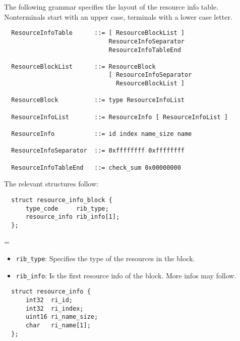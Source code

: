 \documentclass[12pt, a4paper]{article}
\newcommand{\code}[1]{{\tt #1}}
\newenvironment{nitemize}{
  \newdimen\oldparindent
  \oldparindent=\parindent
  \begin{itemize}
  \itemindent=-\oldparindent
}{
  \end{itemize}
}
\newcommand{\codeblockbegin}{\begin{flushleft}\begin{minipage}{\textwidth}}
\newcommand{\codeblockend}{\end{minipage}\end{flushleft}}
\begin{document}
The following grammar specifies the layout of the resource info table.
Nonterminals start with an upper case, terminals with a lower case letter.
%
\begin{verbatim}
  ResourceInfoTable      ::= [ ResourceBlockList ]
                             ResourceInfoSeparator
                             ResourceInfoTableEnd

  ResourceBlockList      ::= ResourceBlock
                             [ ResourceInfoSeparator
                               ResourceBlockList ]

  ResourceBlock          ::= type ResourceInfoList

  ResourceInfoList       ::= ResourceInfo [ ResourceInfoList ]

  ResourceInfo           ::= id index name_size name

  ResourceInfoSeparator  ::= 0xffffffff 0xffffffff

  ResourceInfoTableEnd   ::= check_sum 0x00000000
\end{verbatim}
%
The relevant structures follow:
%
\codeblockbegin
\begin{verbatim}
  struct resource_info_block {
      type_code     rib_type;
      resource_info rib_info[1];
  };
\end{verbatim}
\codeblockend
%
\begin{nitemize}
\item{\code{rib\_type}:
  Specifies the type of the resources in the block.
}
\item{\code{rib\_info}:
  Is the first resource info of the block. More infos may follow.
}
\end{nitemize}
%
\codeblockbegin
\begin{verbatim}
  struct resource_info {
      int32  ri_id;
      int32  ri_index;
      uint16 ri_name_size;
      char   ri_name[1];
  };
\end{verbatim}
\codeblockend
\end{document}
